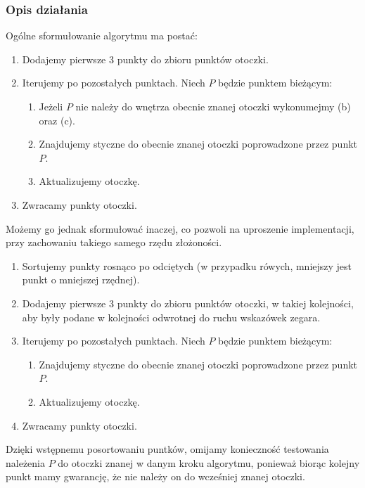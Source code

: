 \documentclass[11pt]{article}
\theoremstyle{remark} \newtheorem{definition}{def.}
\theoremstyle{definition} \newtheorem{twierdzenie}{tw.}
\begin{document}
    \subsubsection{Opis działania}
    Ogólne sformułowanie algorytmu ma postać:
    \begin{enumerate}
        \item   Dodajemy pierwsze 3 punkty do zbioru punktów otoczki. 
        \item   Iterujemy po pozostałych punktach. Niech $P$ będzie punktem bieżącym:
                \begin{enumerate}
                    \item   Jeżeli $P$ nie należy do wnętrza obecnie znanej otoczki wykonumejmy (b) oraz (c).
                    \item   Znajdujemy styczne do obecnie znanej otoczki poprowadzone przez punkt $P$. 
                    \item   Aktualizujemy otoczkę.
                \end{enumerate}
        \item   Zwracamy punkty otoczki. 
    \end{enumerate}


    Możemy go jednak sformułować inaczej, co pozwoli na uproszenie implementacji, przy zachowaniu takiego samego rzędu złożoności. 

    \begin{enumerate}
        \item   Sortujemy punkty rosnąco po odciętych (w przypadku rówych, mniejszy jest punkt o mniejszej rzędnej).
        \item   Dodajemy pierwsze 3 punkty do zbioru punktów otoczki, w takiej kolejności, aby były podane w kolejności odwrotnej 
                do ruchu wskazówek zegara. 
        \item   Iterujemy po pozostałych punktach. Niech $P$ będzie punktem bieżącym: 
                \begin{enumerate}
                    \item   Znajdujemy styczne do obecnie znanej otoczki poprowadzone przez punkt $P$.
                    \item   Aktualizujemy otoczkę. 
                \end{enumerate}
        \item   Zwracamy punkty otoczki.
    \end{enumerate}


    Dzięki wstępnemu posortowaniu puntków, omijamy konieczność testowania należenia $P$ do otoczki znanej w danym kroku algorytmu, ponieważ
    biorąc kolejny punkt mamy gwarancję, że nie należy on do wcześniej znanej otoczki. 
\end{document}
